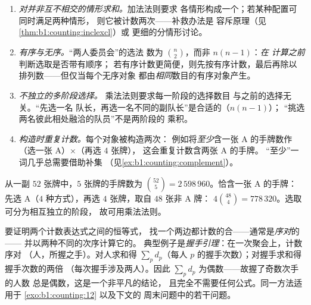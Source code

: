 \begin{remark}[计数中的常见误区]\label{rem:b1:counting:pitfalls}
\begin{enumerate}
  \item \emph{对并非互不相交的情形求和。}加法法则要求
        各情形构成一个；若某种配置可同时满足两种情形，
        则它被计数两次——补救办法是
        容斥原理（见\cref{thm:b1:counting:inclexcl}）或
        更细的分情形讨论。
  \item \emph{有序与无序。}“两人委员会”的选法
        数为 $\binom n2$，而非 $n(n-1)$：\emph{在
        计算之前}判断选取是否带有顺序；
        若有序计数更简便，则先按有序计数，最后再除以
        排列数——但仅当每个无序对象
        都由\emph{相同}数目的有序对象产生。
  \item \emph{不独立的多阶段选择。}
        乘法法则要求每一阶段的选择数目
        与之前的选择无关。“先选一名
        队长，再选一名不同的副队长”是合适的（$n(n-1)$）；
        “挑选两名彼此相处融洽的队员”不是两阶段的
        乘积。
  \item \emph{构造时重复计数。}每个对象被构造两次：
        例如将\emph{至少}含一张 A 的手牌数作
        （选一张 A）$\times$（再选 $4$ 张牌），
        这会重复计数含两张 A 的手牌。
        “至少”一词几乎总需要借助补集
        （见\cref{ex:b1:counting:complement}）。
\end{enumerate}
\end{remark}

\begin{example}[扑克式计数]\label{ex:b1:counting:poker}
从一副 $52$ 张牌中，$5$ 张牌的手牌数为
$\binom{52}{5} = 2\,598\,960$。恰含一张 A 的手牌：
先选 A（$4$ 种方式），再选 $4$ 张牌，取自 $48$ 张非 A 牌：
$4 \binom{48}{4} = 778\,320$。选取可分为相互独立的阶段，
故可用乘法法则。
\end{example}

\begin{method}[双重计数]\label{met:b1:counting:doublecount}
要证明两个计数表达式之间的恒等式，
找一个两边都计数的合——通常是\emph{序对}的——
并以两种不同的次序计算它的。
典型例子是\emph{握手引理}：在一次聚会上，计数序对
（人，所握之手）。对人求和得 $\sum_p d_p$（每人
$p$ 的握手次数）；对握手求和得握手次数的两倍
（每次握手涉及两人）。因此
$\sum_p d_p$ 为偶数——故握了奇数次手的人数
总是偶数，这是一个非平凡的结论，
且完全不需要任何公式。同一方法适用于
\cref{exo:b1:counting:12} 以及下文的
周末问题中的若干问题。
\end{method}

